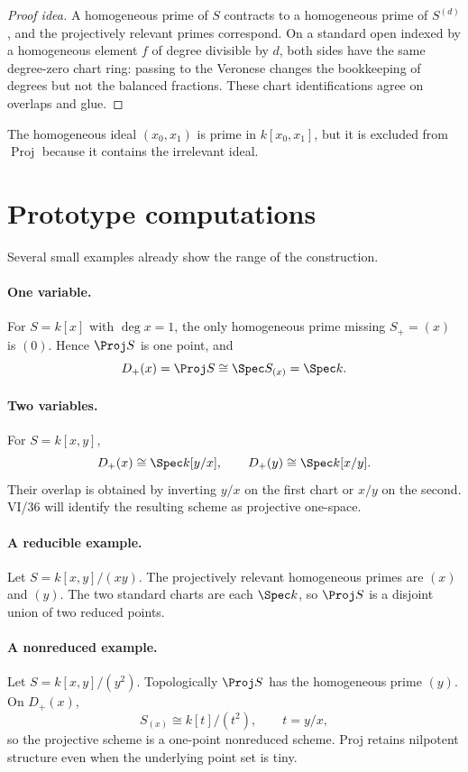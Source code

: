 \begin{proof}[Proof idea]
A homogeneous prime of \(S\) contracts to a homogeneous prime of \(S^{(d)}\), and the projectively relevant primes correspond.  On a standard open indexed by a homogeneous element \(f\) of degree divisible by \(d\), both sides have the same degree-zero chart ring: passing to the Veronese changes the bookkeeping of degrees but not the balanced fractions.  These chart identifications agree on overlaps and glue.
\end{proof}

\begin{example}\label{ex:vi35-expand-03}
The homogeneous ideal $(x_0,x_1)$ is prime in $k[x_0,x_1]$, but it is excluded from $\operatorname{Proj}$ because it contains the irrelevant ideal.
\end{example}
\section{Prototype computations}
Several small examples already show the range of the construction.

\paragraph{One variable.}
For \(S=k[x]\) with \(\deg x=1\), the only homogeneous prime missing \(S_+=(x)\) is \((0)\).  Hence \(\Proj S\) is one point, and
\[
D_+(x)=\Proj S\cong\Spec S_{(x)}=\Spec k.
\]

\paragraph{Two variables.}
For \(S=k[x,y]\),
\[
D_+(x)\cong\Spec k[y/x],\qquad D_+(y)\cong\Spec k[x/y].
\]
Their overlap is obtained by inverting \(y/x\) on the first chart or \(x/y\) on the second.  VI/36 will identify the resulting scheme as projective one-space.

\paragraph{A reducible example.}
Let \(S=k[x,y]/(xy)\).  The projectively relevant homogeneous primes are \((x)\) and \((y)\).  The two standard charts are each \(\Spec k\), so \(\Proj S\) is a disjoint union of two reduced points.

\paragraph{A nonreduced example.}
Let \(S=k[x,y]/(y^2)\).  Topologically \(\Proj S\) has the homogeneous prime \((y)\).  On \(D_+(x)\),
\[
S_{(x)}\cong k[t]/(t^2),\qquad t=y/x,
\]
so the projective scheme is a one-point nonreduced scheme.  Proj retains nilpotent structure even when the underlying point set is tiny.


